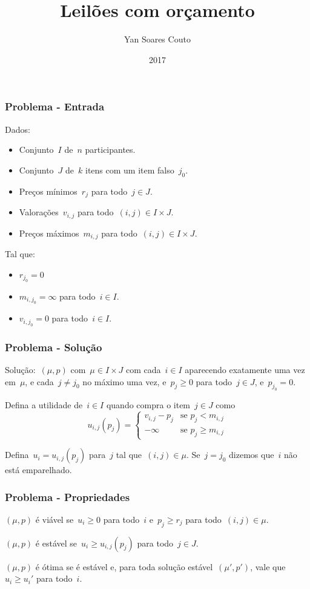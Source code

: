 \documentclass[10pt, compress]{beamer}
\title{Leilões com orçamento}
\subtitle{Yan Soares Couto}
\date{2017}
\institute{Instituto de Matemática e Estatística}
\begin{document}
\maketitle

\begin{frame}[fragile]
	\frametitle{Problema - Entrada}

	Dados:
	\begin{itemize}
		\item Conjunto~$I$ de~$n$ participantes.
		\item Conjunto~$J$ de~$k$ itens com um item falso~$j_0$.
		\item Preços mínimos~$r_j$ para todo~$j \in J$.
		\item Valorações~$v_{i,j}$ para todo~$(i, j) \in I \times J$.
		\item Preços máximos~$m_{i,j}$ para todo~$(i, j) \in I \times J$.
	\end{itemize}

	Tal que:
	\begin{itemize}
		\item $r_{j_0} = 0$
		\item $m_{i, j_0} = \infty$ para todo~$i \in I$.
		\item $v_{i, j_0} = 0$ para todo~$i \in I$.
	\end{itemize}

\end{frame}

\begin{frame}[fragile]
	\frametitle{Problema - Solução}

	Solução:~$(\mu, p)$ com~$\mu \in I \times J$ com cada~$i \in I$ aparecendo exatamente uma vez em~$\mu$, e cada~$j \neq j_0$ no máximo uma vez, e~$p_j \geq 0$ para todo~$j \in J$, e~$p_{j_0} = 0$.
	\vfill

	Defina a utilidade de~$i \in I$ quando compra o item~$j \in J$ como
		$$ u_{i,j}(p_j) = \left\{
			\begin{array}{ll}
				v_{i,j} - p_j & \text{se $p_j < m_{i,j}$} \\
					-\infty & \text{se $p_j \geq m_{i, j}$}
			\end{array} \right.
				$$
	\vfill

	Defina~$u_i = u_{i,j}(p_j)$ para~$j$ tal que~$(i, j) \in \mu$. Se~$j = j_0$ dizemos que~$i$ \alert{não está emparelhado}.

\end{frame}

\begin{frame}[fragile,label=solucao]
	\frametitle{Problema - Propriedades}

	$(\mu, p)$ é \alert{viável} se~$u_i \geq 0$ para todo~$i$ e~$p_j \geq r_j$ para todo~$(i, j) \in \mu$.
	\vfill

	$(\mu, p)$ é \alert{estável} se~$u_i \geq u_{i,j}(p_j)$ para todo~$j \in J$.
	\vfill

	$(\mu, p)$ é \alert{ótima} se é estável e, para toda solução estável~$(\mu', p')$, vale que~$u_i \geq u_i'$ para todo~$i$.
\end{frame}
\end{document}
